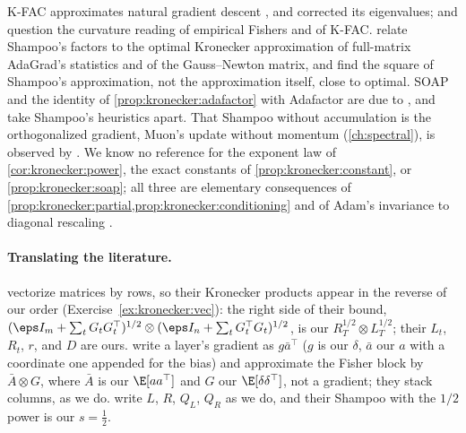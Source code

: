 \begin{refsection}
K-FAC \parencite{MartensGrosse2015} approximates natural gradient descent \parencite{Amari1998}, and \textcite{GeorgeEtAl2018} corrected its eigenvalues; \textcite{KunstnerHennigBalles2019} and \textcite{Benzing2022} question the curvature reading of empirical Fishers and of K-FAC. \Textcite{MorwaniEtAl2025} relate Shampoo's factors to the optimal Kronecker approximation of full-matrix AdaGrad's statistics and of the Gauss--Newton matrix, and find the square of Shampoo's approximation, not the approximation itself, close to optimal. SOAP and the identity of \cref{prop:kronecker:adafactor} with Adafactor \parencite{ShazeerStern2018} are due to \textcite{VyasEtAl2025}, and \textcite{EschenhagenEtAl2025} take Shampoo's heuristics apart. That Shampoo without accumulation is the orthogonalized gradient, Muon's update without momentum (\cref{ch:spectral}), is observed by \textcite{BernsteinNewhouse2024}. We know no reference for the exponent law of \cref{cor:kronecker:power}, the exact constants of \cref{prop:kronecker:constant}, or \cref{prop:kronecker:soap}; all three are elementary consequences of \cref{prop:kronecker:partial,prop:kronecker:conditioning} and of Adam's invariance to diagonal rescaling \parencite{KingmaBa2015}.

\paragraph{Translating the literature.} \Textcite{GuptaKorenSinger2018} vectorize matrices by rows, so their Kronecker products appear in the reverse of our order (Exercise~\ref{ex:kronecker:vec}): the right side of their bound, $(\eps I_m+\sum_tG_tG_t^\top)^{1/2}\otimes(\eps I_n+\sum_tG_t^\top G_t)^{1/2}$, is our $R_T^{1/2}\otimes L_T^{1/2}$; their $L_t$, $R_t$, $r$, and $D$ are ours. \Textcite{MartensGrosse2015} write a layer's gradient as $g\bar a^\top$ ($g$ is our $\delta$, $\bar a$ our $a$ with a coordinate one appended for the bias) and approximate the Fisher block by $\bar A\otimes G$, where $\bar A$ is our $\E[aa^\top]$ and $G$ our $\E[\delta\delta^\top]$, not a gradient; they stack columns, as we do. \Textcite{VyasEtAl2025} write $L$, $R$, $Q_L$, $Q_R$ as we do, and their Shampoo with the $1/2$ power is our $s=\frac12$.

\printchapterbib
\end{refsection}
